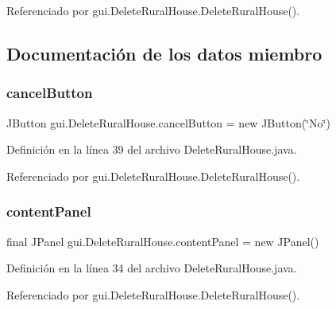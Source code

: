 Referenciado por gui.\+Delete\+Rural\+House.\+Delete\+Rural\+House().



\subsection{Documentación de los datos miembro}
\mbox{\label{classgui_1_1_delete_rural_house_a342b527007fadd1b9aed35227d31a57f}} 
\subsubsection{\texorpdfstring{cancelButton}{cancelButton}}
{\footnotesize\ttfamily J\+Button gui.\+Delete\+Rural\+House.\+cancel\+Button = new J\+Button(\char`\"{}No\char`\"{})\hspace{0.3cm}{\ttfamily [private]}}



Definición en la línea 39 del archivo Delete\+Rural\+House.\+java.



Referenciado por gui.\+Delete\+Rural\+House.\+Delete\+Rural\+House().

\mbox{\label{classgui_1_1_delete_rural_house_abca92167d065908e2825a0051315c5fa}} 
\subsubsection{\texorpdfstring{contentPanel}{contentPanel}}
{\footnotesize\ttfamily final J\+Panel gui.\+Delete\+Rural\+House.\+content\+Panel = new J\+Panel()\hspace{0.3cm}{\ttfamily [private]}}



Definición en la línea 34 del archivo Delete\+Rural\+House.\+java.



Referenciado por gui.\+Delete\+Rural\+House.\+Delete\+Rural\+House().

\mbox{\label{classgui_1_1_delete_rural_house_ad446803b49fe41357f91279c46854c61}} 
